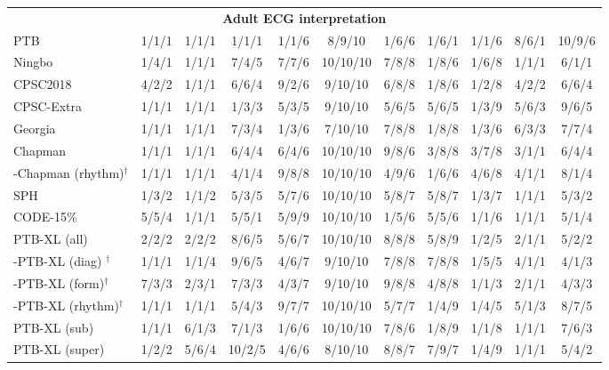 \documentclass{article}
\begin{document}
\begin{table}[htbp]
\begin{tabular}{lcccccccccc}
                    \multicolumn{11}{c}{\textbf{Adult ECG interpretation }} \\
                    PTB & 1/1/1 & 1/1/1 & 1/1/1 & 1/1/6 & 8/9/10 & 1/6/6 & 1/6/1 & 1/1/6 & 8/6/1 & 10/9/6 \\
                    Ningbo & 1/4/1 & 1/1/1 & 7/4/5 & 7/7/6 & 10/10/10 & 7/8/8 & 1/8/6 & 1/6/8 & 1/1/1 & 6/1/1 \\
                    CPSC2018 & 4/2/2 & 1/1/1 & 6/6/4 & 9/2/6 & 9/10/10 & 6/8/8 & 1/8/6 & 1/2/8 & 4/2/2 & 6/6/4 \\
                    CPSC-Extra & 1/1/1 & 1/1/1 & 1/3/3 & 5/3/5 & 9/10/10 & 5/6/5 & 5/6/5 & 1/3/9 & 5/6/3 & 9/6/5 \\
                    Georgia & 1/1/1 & 1/1/1 & 7/3/4 & 1/3/6 & 7/10/10 & 7/8/8 & 1/8/8 & 1/3/6 & 6/3/3 & 7/7/4 \\
                    Chapman & 1/1/1 & 1/1/1 & 6/4/4 & 6/4/6 & 10/10/10 & 9/8/6 & 3/8/8 & 3/7/8 & 3/1/1 & 6/4/4 \\
                    -Chapman (rhythm)${}^\dagger$ & 1/1/1 & 1/1/1 & 4/1/4 & 9/8/8 & 10/10/10 & 4/9/6 & 1/6/6 & 4/6/8 & 4/1/1 & 8/1/4 \\
                    SPH & 1/3/2 & 1/1/2 & 5/3/5 & 5/7/6 & 10/10/10 & 5/8/7 & 5/8/7 & 1/3/7 & 1/1/1 & 5/3/2 \\
                    CODE-15\%  & 5/5/4 & 1/1/1 & 5/5/1 & 5/9/9 & 10/10/10 & 1/5/6 & 5/5/6 & 1/1/6 & 1/1/1 & 5/1/4 \\            
                    PTB-XL (all)  & 2/2/2 & 2/2/2 & 8/6/5 & 5/6/7 & 10/10/10 & 8/8/8 & 5/8/9 & 1/2/5 & 2/1/1 & 5/2/2 \\
                    -PTB-XL (diag) ${}^\dagger$ & 1/1/1 & 1/1/4 & 9/6/5 & 4/6/7 & 9/10/10 & 7/8/8 & 7/8/8 & 1/5/5 & 4/1/1 & 4/1/3 \\
                    -PTB-XL (form)${}^\dagger$ & 7/3/3 & 2/3/1 & 7/3/3 & 4/3/7 & 9/10/10 & 9/8/8 & 4/8/8 & 1/1/3 & 2/1/1 & 4/3/3 \\
                    -PTB-XL (rhythm)${}^\dagger$ & 1/1/1 & 1/1/1 & 5/4/3 & 9/7/7 & 10/10/10 & 5/7/7 & 1/4/9 & 1/4/5 & 5/1/3 & 8/7/5  \\
                    PTB-XL (sub) & 1/1/1 & 6/1/3 & 7/1/3 & 1/6/6 & 10/10/10 & 7/8/6 & 1/8/9 & 1/1/8 & 1/1/1 & 7/6/3 \\
                    PTB-XL (super) & 1/2/2 & 5/6/4 & 10/2/5 & 4/6/6 & 8/10/10 & 8/8/7 & 7/9/7 & 1/4/9 & 1/1/1 & 5/4/2 \\
                    \midrule
                    

\end{tabular}
\end{table}
\end{document}
